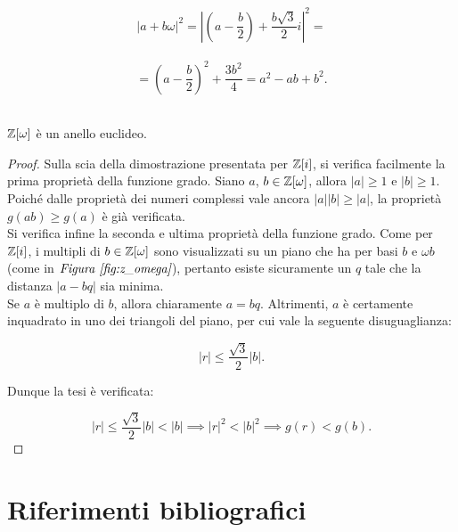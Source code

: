 \documentclass[a4paper]{article}
\begin{document}
\[ \left|a+b\omega\right|^2 = \left|\left(a-\frac{b}{2}\right) + \frac{b\sqrt{3}}{2}i\right|^2 =\] \\

\[= \left(a-\frac{b}{2}\right)^2 + \frac{3b^2}{4} = a^2 - ab + b^2.\] \\

\begin{theorem}
    $\mathbb{Z}[\omega]$ è un anello euclideo.
\end{theorem}

\begin{proof}
    Sulla scia della dimostrazione presentata per $\mathbb{Z}[i]$, si verifica facilmente
    la prima proprietà della funzione grado. Siano $a$, $b \in \mathbb{Z}[\omega]$, allora
    $\left|a\right| \geq 1$ e $\left|b\right| \geq 1$. Poiché dalle proprietà
    dei numeri complessi vale ancora $\left|a\right| \left|b\right| \geq \left|a\right|$,
    la proprietà $g(ab) \geq g(a)$ è già verificata. \\

    Si verifica infine la seconda e ultima proprietà della funzione grado. Come per
    $\mathbb{Z}[i]$, i multipli di $b \in \mathbb{Z}[\omega]$ sono visualizzati su un piano che
    ha per basi $b$ e $\omega b$ (come in $\textit{Figura \ref{fig:z_omega}}$), pertanto
    esiste sicuramente un $q$ tale che la distanza $\left|a-bq\right|$ sia minima. \\

    Se $a$ è multiplo di $b$, allora chiaramente $a = bq$. Altrimenti, $a$ è certamente
    inquadrato in uno dei triangoli del piano, per cui vale la seguente disuguaglianza:

    \[\left|r\right| \leq \frac{\sqrt{3}}{2} \left|b\right|.\]

    Dunque la tesi è verificata:

    \[\left|r\right| \leq \frac{\sqrt{3}}{2} \left|b\right| < \left|b\right| \implies \left|r\right|^2 < \left|b\right|^2 \implies g(r) < g(b). \]
\end{proof}

\section{Riferimenti bibliografici}

\printbibliography[heading=none]
\end{document}
